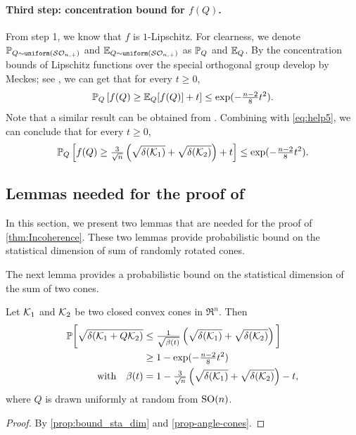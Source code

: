 \paragraph{Third step: concentration bound for $f(Q)$.}
From step 1, we know that $f$ is $1$-Lipschitz. For clearness, we denote $\mathbb{P}_{Q \sim \operatorname{\texttt{uniform}}(\mathcal{S}\mathcal{O}_{n, +})}$ and $\mathbb{E}_{Q \sim \operatorname{\texttt{uniform}}(\mathcal{S}\mathcal{O}_{n, +})}$ as $\mathbb{P}_Q$ and $\mathbb{E}_Q$. By the concentration bounds of Lipschitz functions over the special orthogonal group develop by Meckes; see \citep[Theorem~5.5 and Theorem~5.16]{meckes2019random}, we can get that for every $t\geq0$,
\[\mathbb{P}_Q\left[f(Q) \geq \mathbb{E}_Q[f(Q)] + t\right] \leq \exp(-\tfrac{n-2}{8}t^2).\]
Note that a similar result can be obtained from \citep[Theorem~5.2.7]{vershynin2018high}.
Combining with \eqref{eq:help5}, we can conclude that for every $t\geq0$,
\[\mathbb{P}_Q\left[f(Q) \geq  \tfrac{3}{\sqrt{n}}\left( \sqrt{\delta(\mathcal{K}_1)} + \sqrt{\delta(\mathcal{K}_2)} \right) + t\right] \leq \exp(-\tfrac{n-2}{8}t^2).\]

\subsection{Lemmas needed for the proof of } \label{sec:prob_bounds}
In this section, we present two lemmas that are needed for the proof of \autoref{thm:Incoherence}. These two lemmas provide probabilistic bound on the statistical dimension of sum of randomly rotated cones. 

The next lemma provides a probabilistic bound on the statistical dimension of the sum of two cones. 
\begin{lemma} \label{prop-bound-sta-dim}
   Let $\mathcal{K}_1$ and $\mathcal{K}_2$ be two closed convex cones in $\Re^n$. Then 
 \begin{align*}
   \mathbb{P}\bigg[\sqrt{\delta(\mathcal{K}_1 + Q\mathcal{K}_2)} &\leq \tfrac{1}{\sqrt{\beta(t)}}\left(\sqrt{\delta(\mathcal{K}_1)} + \sqrt{\delta(\mathcal{K}_2)} \right) \bigg]
   \\&\geq 1 - \exp(-\tfrac{n-2}{8}t^2)
   \\\hbox{\quad with\quad} \beta(t) &= 1 - \tfrac{3}{\sqrt{n}}\left(\sqrt{\delta(\mathcal{K}_1)} + \sqrt{\delta(\mathcal{K}_2)}\right) - t ,
 \end{align*}
   where $Q$ is drawn uniformly at random from $\operatorname{SO}(n)$.
\end{lemma}

\begin{proof}
    By \autoref{prop:bound_sta_dim} and \autoref{prop-angle-cones}.
\end{proof}

